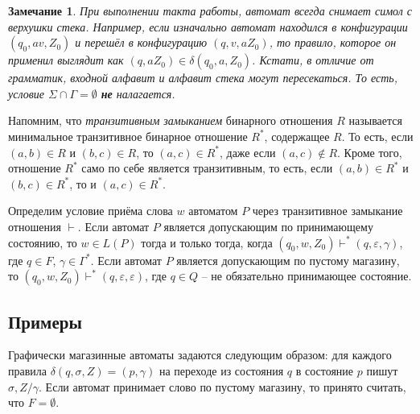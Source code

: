 \documentclass[12pt]{article}
\theoremstyle{definiton}
\newtheorem{Remark}{Замечание}
\theoremstyle{definition}
\theoremstyle{definition}
\let\es\emptyset
\let\eps\varepsilon
\begin{document}
\begin{Remark}
	При выполнении такта работы, автомат всегда снимает симол с верхушки стека. Например, если изначально автомат находился в конфигурации $(q_0,av,Z_0)$ и перешёл в конфигурацию $(q,v,aZ_0)$, то правило, которое он применил выглядит как $(q,aZ_0) \in \delta(q_0,a,Z_0)$. Кстати, в отличие от грамматик, входной алфавит и алфавит стека могут пересекаться. То есть, условие $\Sigma\cap\Gamma = \es$ \textbf{не} налагается.
\end{Remark}

Напомним, что \emph{транзитивным замыканием} бинарного отношения $R$ называется минимальное транзитивное бинарное отношение $R^*$, содержащее $R$. То есть, если $(a,b) \in R$ и $(b,c) \in R$, то $(a,c) \in R^*$, даже если $(a,c) \not\in R$. Кроме того, отношение $R^*$ само по себе является транзитивным, то есть, если $(a,b) \in R^*$ и $(b,c) \in R^*$, то и  $(a,c) \in R^*$.  

Определим условие приёма слова $w$ автоматом $P$ через транзитивное замыкание отношения $\vdash$. Если автомат $P$ является допускающим по принимающему состоянию, то $w \in L(P)$ тогда и только тогда, когда $(q_0,w,Z_0) \vdash^* (q,\eps, \gamma) $,  где $q\in F$, $\gamma \in \Gamma^*$. Если автомат $P$ является допускающим по пустому магазину, то $(q_0,w,Z_0) \vdash^* (q, \eps, \eps)$, где $q \in Q$ -- не обязательно принимающее состояние.

\subsection{Примеры}

Графически магазинные автоматы задаются следующим образом: для каждого правила $\delta(q,\sigma,Z) = (p,\gamma)$ на переходе из состояния $q$ в состояние $p$ пишут $\sigma,Z/\gamma$. Если автомат принимает слово по пустому магазину, то принято считать, что $F = \es$.


\end{document}
